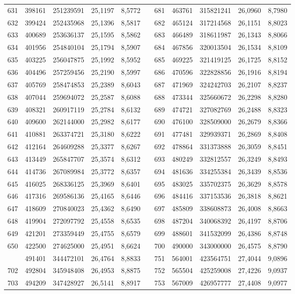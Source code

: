 \begin{longtable}{rrrrrrrrrrr}
631&398161&251239591&25,1197&8,5772&&681&463761&315821241&26,0960&8,7980\\
632&399424&252435968&25,1396&8,5817&&682&465124&317214568&26,1151&8,8023\\
633&400689&253636137&25,1595&8,5862&&683&466489&318611987&26,1343&8,8066\\
634&401956&254840104&25,1794&8,5907&&684&467856&320013504&26,1534&8,8109\\
635&403225&256047875&25,1992&8,5952&&685&469225&321419125&26,1725&8,8152\\
636&404496&257259456&25,2190&8,5997&&686&470596&322828856&26,1916&8,8194\\
637&405769&258474853&25,2389&8,6043&&687&471969&324242703&26,2107&8,8237\\
638&407044&259694072&25,2587&8,6088&&688&473344&325660672&26,2298&8,8280\\
639&408321&260917119&25,2784&8,6132&&689&474721&327082769&26,2488&8,8323\\
640&409600&262144000&25,2982&8,6177&&690&476100&328509000&26,2679&8,8366\\
641&410881&263374721&25,3180&8,6222&&691&477481&329939371&26,2869&8,8408\\
642&412164&264609288&25,3377&8,6267&&692&478864&331373888&26,3059&8,8451\\
643&413449&265847707&25,3574&8,6312&&693&480249&332812557&26,3249&8,8493\\
644&414736&267089984&25,3772&8,6357&&694&481636&334255384&26,3439&8,8536\\
645&416025&268336125&25,3969&8,6401&&695&483025&335702375&26,3629&8,8578\\
646&417316&269586136&25,4165&8,6446&&696&484416&337153536&26,3818&8,8621\\
647&418609&270840023&25,4362&8,6490&&697&485809&338608873&26,4008&8,8663\\
648&419904&272097792&25,4558&8,6535&&698&487204&340068392&26,4197&8,8706\\
649&421201&273359449&25,4755&8,6579&&699&488601&341532099&26,4386&8,8748\\
650&422500&274625000&25,4951&8,6624&&700&490000&343000000&26,4575&8,8790\\
\newpage
701&491401&344472101&26,4764&8,8833&&751&564001&423564751&27,4044&9,0896\\
702&492804&345948408&26,4953&8,8875&&752&565504&425259008&27,4226&9,0937\\
703&494209&347428927&26,5141&8,8917&&753&567009&426957777&27,4408&9,0977\\

\end{longtable}
